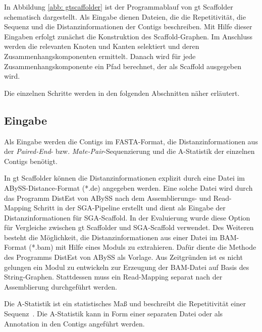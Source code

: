 \documentclass[a4paper,10pt,parskip]{scrartcl}
\begin{document}
In Abbildung \ref{abb: gtscaffolder} ist der Programmablauf von gt
Scaffolder schematisch dargestellt. Als Eingabe dienen Dateien,
die die Repetitivität, die Sequenz und die Distanzinformationen der Contigs
beschreiben. Mit Hilfe dieser Eingaben erfolgt zunächst die Konstruktion des
Scaffold-Graphen. Im Anschluss werden die relevanten Knoten
und Kanten selektiert und deren Zusammenhangskomponenten ermittelt.
Danach wird für jede Zusammenhangskomponente ein Pfad berechnet,
der als Scaffold ausgegeben wird.

Die einzelnen Schritte werden in den folgenden Abschnitten näher erläutert.

\subsection{Eingabe}
Als Eingabe werden die Contigs im FASTA-Format, die
Distanzinformationen aus der \textit{Paired-End}-
bzw. \textit{Mate-Pair}-Sequenzierung und die A-Statistik der einzelnen
Contigs benötigt.

In gt Scaffolder können die Distanzinformationen explizit durch eine
Datei im ABySS-Distance-Format (*.de) angegeben werden. Eine solche
Datei wird durch das Programm DistEst von ABySS nach dem Assemblierungs-
und Read-Mapping Schritt in der SGA-Pipeline erstellt und dient als
Eingabe der Distanzinformationen für SGA-Scaffold. In der Evaluierung
wurde diese Option für Vergleiche zwischen gt Scaffolder und SGA-Scaffold
verwendet. Des Weiteren besteht die Möglichkeit, die Distanzinformationen aus
einer Datei im BAM-Format (*.bam) mit Hilfe eines Moduls zu
extrahieren. Dafür diente die Methode des Programms DistEst von ABySS
als Vorlage. Aus Zeitgründen ist es nicht gelungen ein Modul zu
entwickeln zur Erzeugung der BAM-Datei auf Basis des String-Graphen.
Stattdessen muss ein Read-Mapping separat nach der Assemblierung
durchgeführt werden.

Die A-Statistik ist ein statistisches Maß und beschreibt die Repetitivität
einer Sequenz~\cite{Myers:2005iq}. Die A-Statistik kann in Form einer
separaten Datei oder als Annotation in den Contigs angeführt werden.
\end{document}
